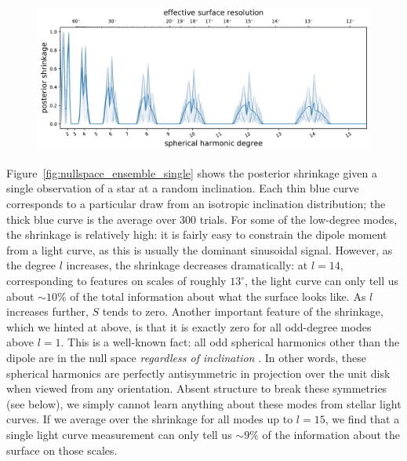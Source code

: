 \documentclass[modern]{aastex62}
\begin{document}
\begin{figure}[t!]
    \begin{centering}
        \includegraphics[width=\linewidth]{figures/nullspace_ensemble_single.pdf}
    \end{centering}
\end{figure}

Figure~\ref{fig:nullspace_ensemble_single} shows the posterior shrinkage
given a single observation of a star at a random inclination.
Each thin blue curve corresponds to a particular draw from an isotropic
inclination distribution; the thick blue curve is the average over 300 trials.
For some of the low-degree modes, the shrinkage is relatively high: it is
fairly easy to constrain the dipole moment from a light curve, as this is
usually the dominant sinusoidal signal. However, as the degree $l$
increases, the shrinkage decreases dramatically: at $l = 14$, corresponding
to features on scales of roughly $13^\circ$, the light curve
can only tell us about $\sim 10\%$ of the total information about what the
surface looks like. As $l$ increases further, $S$ tends to zero.
Another important feature of the shrinkage, which we hinted at above,
is that it is exactly zero for
all odd-degree modes above $l = 1$. This is a well-known fact: all odd spherical
harmonics other than the dipole are in the null space \emph{regardless of
    inclination} \citep[e.g.,][]{Luger2019}. In other words, these spherical
harmonics are perfectly antisymmetric in projection over the unit disk
when viewed from any orientation. Absent structure to break these symmetries
(see below), we simply cannot learn anything about these modes from
stellar light curves. If we average over the shrinkage for all modes up to $l=15$,
we find that a single light curve measurement can only tell us $\sim 9\%$
of the information about the surface on those scales.
\end{document}
